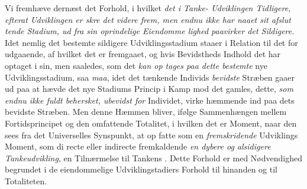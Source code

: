 Vi fremhæve dernæst det Forhold, i hvilket \emph{det i Tanke-%
Udviklingen Tidligere, efterat Udviklingen er skre\-%
det videre frem, men endnu ikke har naaet sit afslut\-%
tende Stadium, ud fra sin oprindelige Eiendomme\-%
lighed paavirker det Sildigere.} Idet nemlig det bestemte
sildigere Udviklingsstadium staaer i Relation til det for\-%
udgaaende, af hvilket det er fremgaaet, og hvis Bevidstheds
Indhold det har optaget i sin, men saaledes, som det \emph{kan op\-%
tages paa dette bestemte} nye Udviklingsstadium, saa \emph{maa},
idet det tænkende Individs \emph{bevidste} Stræben gaaer ud paa
at hævde det nye Stadiums Princip i Kamp mod det gamles,
dette, \emph{som endnu ikke fuldt behersket, ubevidst for}
Individet, virke hæmmende ind paa dets bevidste Stræben.
Men denne Hæmmen bliver, ifølge Sammenhængen mellem
Fortidsprincipet og den omfattende Totalitet, i hvilken det er
Moment, naar den sees fra det Universelles Synspunkt, at op\-%
fatte som en \emph{fremskridende} Udviklings Moment, som di\-%
recte eller indirecte fremkaldende \emph{en dybere og alsidigere
Tankeudvikling}, en Tilnærmelse til Tankens . Dette
Forhold er med Nødvendighed begrundet i de eiendommelige
Udviklingstadiers Forhold til hinanden og til Totaliteten.

